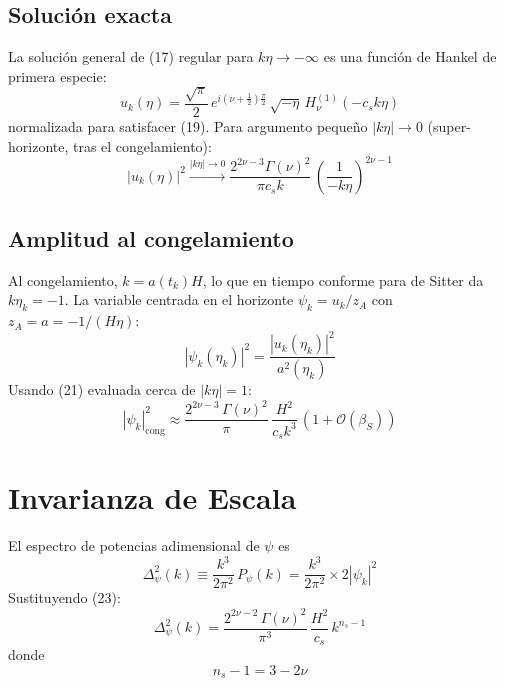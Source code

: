\documentclass[12pt,a4paper]{article}
\begin{document}
\subsection{Solución exacta}

La solución general de (17) regular para $k\eta \to -\infty$ es una función de Hankel de primera especie:
\begin{equation}
u_k(\eta) = \frac{\sqrt{\pi}}{2}\,e^{i(\nu + \frac{1}{2})\frac{\pi}{2}}\,\sqrt{-\eta}\,H_\nu^{(1)}(-c_s k\eta) \tag{20}
\end{equation}
normalizada para satisfacer (19). Para argumento pequeño $|k\eta| \to 0$ (super-horizonte, tras el congelamiento):
\begin{equation}
|u_k(\eta)|^2 \xrightarrow{|k\eta| \to 0} \frac{2^{2\nu-3}\Gamma(\nu)^2}{\pi c_s k}\,\left(\frac{1}{-k\eta}\right)^{2\nu - 1} \tag{21}
\end{equation}

\subsection{Amplitud al congelamiento}

Al congelamiento, $k = a(t_k)H$, lo que en tiempo conforme para de Sitter da $k\eta_k = -1$. La variable centrada en el horizonte $\psi_k = u_k / z_A$ con $z_A = a = -1/(H\eta)$:
\begin{equation}
|\psi_k(\eta_k)|^2 = \frac{|u_k(\eta_k)|^2}{a^2(\eta_k)} \tag{22}
\end{equation}
Usando (21) evaluada cerca de $|k\eta| = 1$:
\begin{equation}
|\psi_k|_\text{cong}^2 \approx \frac{2^{2\nu - 3}\,\Gamma(\nu)^2}{\pi}\,\frac{H^2}{c_s k^3}\,(1 + \mathcal{O}(\beta_S)) \tag{23}
\end{equation}

\section{Invarianza de Escala}

El espectro de potencias adimensional de $\psi$ es
\begin{equation}
\Delta_\psi^2(k) \equiv \frac{k^3}{2\pi^2}\,P_\psi(k) = \frac{k^3}{2\pi^2} \times 2|\psi_k|^2 \tag{24}
\end{equation}
Sustituyendo (23):
\begin{equation}
\Delta_\psi^2(k) = \frac{2^{2\nu-2}\,\Gamma(\nu)^2}{\pi^3}\,\frac{H^2}{c_s}\,k^{n_s - 1} \tag{25}
\end{equation}
donde
\begin{equation}
n_s - 1 = 3 - 2\nu \tag{26}
\end{equation}
\end{document}
